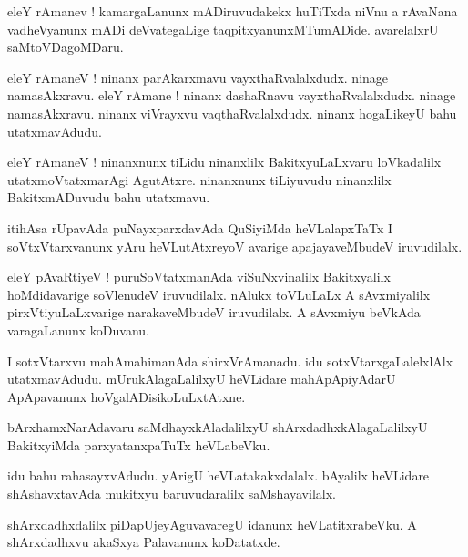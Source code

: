\documentclass{article}
\begin{document}
\begin{mn}%
eleY rAmanev ! kamargaLanunx mADiruvudakekx huTiTxda niVnu a rAvaNana vadheVyanunx mADi 
deVvategaLige taqpitxyanunxMTumADide. avarelalxrU saMtoVDagoMDaru.
\end{mn}

\begin{mn}%
eleY rAmaneV ! ninanx parAkarxmavu vayxthaRvalalxdudx. ninage namasAkxravu. eleY rAmane ! ninanx 
dashaRnavu vayxthaRvalalxdudx. ninage namasAkxravu. ninanx viVrayxvu vaqthaRvalalxdudx. ninanx 
hogaLikeyU bahu utatxmavAdudu.
\end{mn}

\begin{mn}%
eleY rAmaneV ! ninanxnunx tiLidu ninanxlilx BakitxyuLaLxvaru loVkadalilx utatxmoVtatxmarAgi 
AgutAtxre. ninanxnunx tiLiyuvudu ninanxlilx BakitxmADuvudu bahu utatxmavu.
\end{mn}

\begin{mn}%
itihAsa rUpavAda puNayxparxdavAda QuSiyiMda heVLalapxTaTx I soVtxVtarxvanunx yAru heVLutAtxreyoV 
avarige apajayaveMbudeV iruvudilalx.
\end{mn}

\begin{mn}%
eleY pAvaRtiyeV ! puruSoVtatxmanAda viSuNxvinalilx Bakitxyalilx hoMdidavarige soVlenudeV 
iruvudilalx. nAlukx toVLuLaLx A sAvxmiyalilx pirxVtiyuLaLxvarige narakaveMbudeV iruvudilalx. A 
sAvxmiyu beVkAda varagaLanunx koDuvanu.
\end{mn}

\begin{mn}%
I sotxVtarxvu mahAmahimanAda shirxVrAmanadu. idu sotxVtarxgaLalelxlAlx utatxmavAdudu. 
mUrukAlagaLalilxyU heVLidare mahApApiyAdarU ApApavanunx hoVgalADisikoLuLxtAtxne.
\end{mn}

\begin{mn}%
bArxhamxNarAdavaru saMdhayxkAladalilxyU shArxdadhxkAlagaLalilxyU BakitxyiMda parxyatanxpaTuTx 
heVLabeVku.
\end{mn}

\begin{mn}%
idu bahu rahasayxvAdudu. yArigU heVLatakakxdalalx. bAyalilx heVLidare shAshavxtavAda mukitxyu 
baruvudaralilx saMshayavilalx.
\end{mn}

\begin{mn}%
shArxdadhxdalilx piDapUjeyAguvavaregU idanunx heVLatitxrabeVku. A shArxdadhxvu akaSxya Palavanunx 
koDatatxde.
\end{mn}
\end{document}
